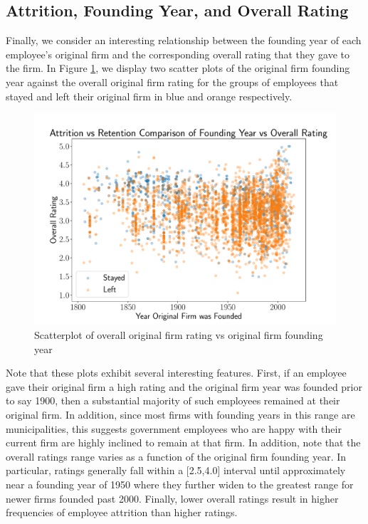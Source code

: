 \documentclass[10pt]{article}
\begin{document}
\subsection{Attrition, Founding Year, and Overall Rating}
\hspace{\parindent}
Finally, we consider an interesting relationship between the founding year 
of each employee's original firm and the corresponding overall rating that 
they gave to the firm.  In Figure \ref{fig:attmod}, we display two scatter 
plots of the original firm founding year against the overall original firm rating 
for the groups of employees that stayed and left their original firm in blue and 
orange respectively. 
%
\begin{figure}[thb]
    \centering
	\includegraphics[width=1.0\linewidth]{attrat.pdf}
	\caption{Scatterplot of overall original firm rating vs original firm founding year}
	\label{fig:attmod}
\end{figure}
%
Note that these plots exhibit several interesting features.  First, if an employee gave 
their original firm a high rating and the original firm year was founded prior to 
say 1900, then a substantial majority of such employees remained at their original 
firm.  In addition, since most firms with founding years in this range are municipalities, 
this suggests government employees who are happy with their current firm are highly inclined 
to remain at that firm.  In addition, note that the overall ratings range varies as a function 
of the original firm founding year.  In particular, ratings generally fall within 
a [2.5,4.0] interval until approximately near a founding year of 1950 where they further 
widen to the greatest range for newer firms founded past 2000.  
Finally, 
lower overall ratings result in higher frequencies of employee attrition than higher ratings.
\end{document}
